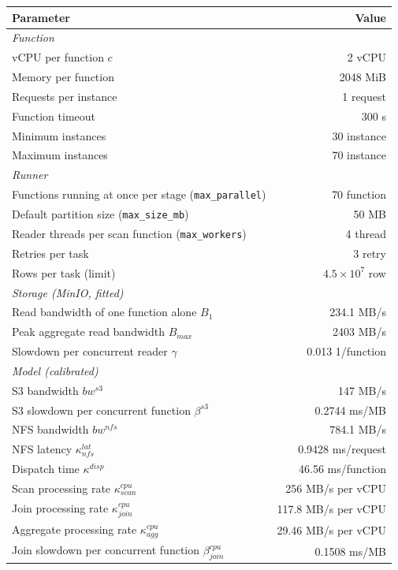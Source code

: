 \begin{tabular}{lr}
\toprule
Parameter & Value \\
\midrule
\multicolumn{2}{l}{\textit{Function}} \\
vCPU per function $c$ & 2 vCPU \\
Memory per function & 2048 MiB \\
Requests per instance & 1 request \\
Function timeout & 300 s \\
Minimum instances & 30 instance \\
Maximum instances & 70 instance \\
\midrule
\multicolumn{2}{l}{\textit{Runner}} \\
Functions running at once per stage (\texttt{max\_parallel}) & 70 function \\
Default partition size (\texttt{max\_size\_mb}) & 50 MB \\
Reader threads per scan function (\texttt{max\_workers}) & 4 thread \\
Retries per task & 3 retry \\
Rows per task (limit) & $4.5\times10^{7}$ row \\
\midrule
\multicolumn{2}{l}{\textit{Storage (MinIO, fitted)}} \\
Read bandwidth of one function alone $B_1$ & 234.1 MB/s \\
Peak aggregate read bandwidth $B_{max}$ & 2403 MB/s \\
Slowdown per concurrent reader $\gamma$ & 0.013 1/function \\
\midrule
\multicolumn{2}{l}{\textit{Model (calibrated)}} \\
S3 bandwidth $bw^{s3}$ & 147 MB/s \\
S3 slowdown per concurrent function $\beta^{s3}$ & 0.2744 ms/MB \\
NFS bandwidth $bw^{nfs}$ & 784.1 MB/s \\
NFS latency $\kappa^{lat}_{nfs}$ & 0.9428 ms/request \\
Dispatch time $\kappa^{disp}$ & 46.56 ms/function \\
Scan processing rate $\kappa^{cpu}_{scan}$ & 256 MB/s per vCPU \\
Join processing rate $\kappa^{cpu}_{join}$ & 117.8 MB/s per vCPU \\
Aggregate processing rate $\kappa^{cpu}_{agg}$ & 29.46 MB/s per vCPU \\
Join slowdown per concurrent function $\beta^{cpu}_{join}$ & 0.1508 ms/MB \\

\end{tabular}
